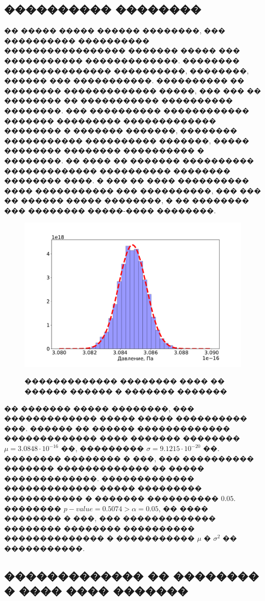 \subsection{���������� ��������}
�� ����� ����� ������ ��������, ��� ���������� ���������� ����������������� ������� ����� ��� ����������� �������������.
�������� ��������������� ����������, ��������, ������ ��� �����������. ���������� �� �������� ������������� �����, ��� ��� ��
�������� �� ����������� ���������� ��������. ��� ���������� ������������ ������� ��������� ������������� �������� � ������� �������, ��������
����������� ���������� �������, ����� �������� �������� ���������� � ��������. �� ���� �� ������� ���������� ������������� ���������� ��������
�������� ����. � ��� �� ���� ���������� ���� ����������� ��� ����������, ��� ��� �� ������ ����� ��������, � �� �������� ��� �������� �����-���� ��������.
\begin{figure}[h!]
{\includegraphics[width=1\linewidth]{hist_p}}
    \caption{������������� �������� ���� �� ������ ������ � ������� �������}
\end{figure}
�� ������� ����� ��������, ��� ������������� ����� ����� ���������� ���. ������ �� ������ ������������� ������������� ����
������� �������� $\mu = 3.0848 \cdot 10^{-16}$ ��, ��������� $\sigma = 9.1215 \cdot 10^{-20}$ ��. �������� �������� � ���, ���
���������� ������� ������������� �� ����� �������������. ������������� ������������� ����� ��������� ����������� � �������
���������� $0.05$. �������� $p-value = 0.5074 > \alpha = 0.05$, �� ���� �������� � ���, ��� ������������� �������� ��������
���������� �������������� � ����������� $\mu$ � $\sigma^2$ �� �����������.

\subsection{������������� �� �������� � ���� ���� �������}

